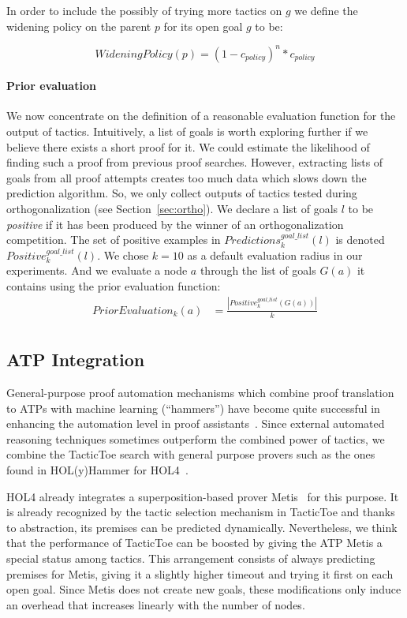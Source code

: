 \documentclass[runningheads,a4paper,draft]{svjour3}
\def\holfour{\textsf{HOL4}\xspace}
\def\holyhammer{\textsf{HOL(y)Hammer}\xspace}
\def\metis{\textsf{Metis}\xspace}
\def\tactictoe{\textsf{TacticToe}\xspace}
\begin{document}
In order to include the possibly of trying more tactics on $g$ we define the
widening policy on the parent $p$ for its open goal $g$ to be:

\[\mathit{WideningPolicy}(p) = (1 - c_{\mathit{policy}})^{n} * 
c_{\mathit{policy}}\]


\paragraph{Prior evaluation}\label{sec:evaluation}

We now concentrate on the definition of a reasonable evaluation function for the
output of tactics. Intuitively, a list of goals is worth exploring further if
we believe there exists a short proof for it. We could estimate the likelihood
of finding such a proof from
previous proof searches. However, extracting lists of goals from all proof
attempts creates too much data which slows down the prediction algorithm.
So, we only
collect outputs of tactics tested during orthogonalization (see
Section~\ref{sec:ortho}). We
declare a list of goals $l$ to be \textit{positive} if it has been produced
by the winner of an orthogonalization competition.
The set of positive examples in
$\mathit{Predictions}^{\mathit{goal\_list}}_k(l)$ is denoted
$\mathit{Positive}^{\mathit{goal\_list}}_k(l)$.
We chose $k=10$ as a default evaluation radius in our experiments.
And we evaluate a node $a$ through the list of goals $G(a)$ it
contains using the prior evaluation function:
\begin{align*}
\mathit{PriorEvaluation}_k (a) &=
  \frac{|\mathit{Positive}^{\mathit{goal\_list}}_k(G(a))|}{k}\\
\end{align*}


\subsection{ATP Integration}\label{sec:atp}
General-purpose proof automation mechanisms which combine proof translation to
ATPs with machine learning (``hammers'') have become quite successful in
enhancing the automation level in proof assistants~\cite{hammers4qed}.
Since external automated reasoning techniques sometimes outperform the combined
power of tactics, we combine the \tactictoe search with
general purpose provers such as the ones found in \holyhammer for
\holfour~\cite{tgck-cpp15}.

\holfour already integrates a superposition-based prover \metis~\cite{metis}
for this purpose. It is already
recognized by the tactic selection mechanism in \tactictoe and thanks to
abstraction, its
premises can be predicted dynamically. Nevertheless,
we think that the performance of \tactictoe can be boosted by giving the ATP
\metis a special status among tactics. This arrangement consists of always
predicting
premises for \metis, giving it a slightly higher timeout and
trying it first on each open goal. Since \metis does not create
new goals, these modifications only induce an overhead that increases linearly
with the number of nodes.
\end{document}

